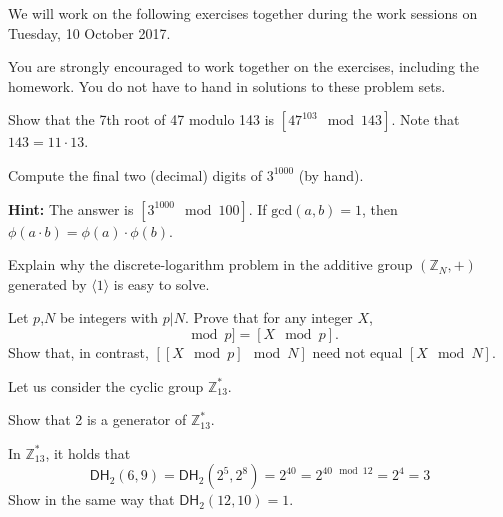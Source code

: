 \documentclass[a4paper,10pt,landscape,twocolumn]{scrartcl}
\newcommand\worksession{Tuesday, 10 October 2017}
\begin{document}
\problems

{\sffamily\noindent
We will work on the following exercises together during the work sessions on \worksession.

You are strongly encouraged to work together on the exercises, including the homework. You do not have to hand in solutions to these problem sets.}


\begin{exercise}
Show that the 7th root of 47 modulo 143 is $[47^{103} \mod 143]$. Note that $143=11\cdot 13$.
\end{exercise}

\begin{exercise}
Compute the final two (decimal) digits of $3^{1000}$ (by hand).

\textbf{Hint:} The answer is $[3^{1000} \mod 100]$. If $\text{gcd}(a,b)=1$, then $\phi(a\cdot b)=\phi(a)\cdot\phi(b)$.
\end{exercise}


\begin{exercise}
Explain why the discrete-logarithm problem in the additive group $(\mathbb{Z}_N, +)$ generated by $\langle 1\rangle$ is easy to solve.
\end{exercise}

\begin{exercise}
Let $p$,$N$ be integers with $p|N$. Prove that for any integer $X$,
\begin{equation*}
[[X \mod N]\mod p]=[X \mod p].
\end{equation*}
Show that, in contrast, $[[X \mod p]\mod N]$ need not equal $[X\mod N]$.
\end{exercise}

\begin{exercise}
Let us consider the cyclic group $\mathbb{Z}_{13}^*$.
\begin{subex}
Show that 2 is a generator of $\mathbb{Z}_{13}^*$.
\end{subex}

\begin{subex}
In $\mathbb{Z}_{13}^*$, it holds that 
\[
\mathsf{DH}_2(6,9) = \mathsf{DH}_2(2^5, 2^8) = 2^{40} = 2^{40 \mod 12} = 2^4 = 3
\]
Show in the same way that $\mathsf{DH}_2(12,10)=1$.
\end{subex}
\end{exercise}
\end{document}
